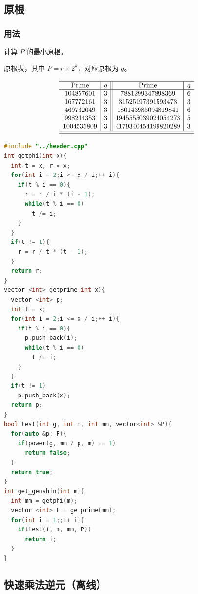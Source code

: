 \documentclass[10pt]{ctexart}
\begin{document}
\begin{multicols}{3}
    \subsection{原根}\label{ux539fux6839}

    \subsubsection{用法}\label{ux7528ux6cd5-9}

    计算 \(P\) 的最小原根。

    原根表，其中 \(P = r\times 2^{k}\)，对应原根为 \(g\)。

    \[
    \begin{array}{c|c||c|c}
    \hline\hline
    \mathrm{Prime} & g & \mathrm{Prime} & g \\ \hline
    104857601  & 3 & 7881299347898369 & 6 \\ 
    167772161  & 3 & 31525197391593473 & 3 \\ 
    469762049  & 3 & 180143985094819841 & 6 \\ 
    998244353  & 3 & 1945555039024054273 & 5 \\ 
    1004535809 & 3 & 4179340454199820289 & 3 \\ \hline\hline
    \hline 
    \end{array}
    \]

\begin{lstlisting}[language={C++}]
#include "../header.cpp"
int getphi(int x){
  int t = x, r = x;
  for(int i = 2;i <= x / i;++ i){
    if(t % i == 0){
      r = r / i * (i - 1);
      while(t % i == 0)
        t /= i;
    }
  }
  if(t != 1){
    r = r / t * (t - 1);
  }
  return r;
}
vector <int> getprime(int x){
  vector <int> p;
  int t = x;
  for(int i = 2;i <= x / i;++ i){
    if(t % i == 0){
      p.push_back(i);
      while(t % i == 0)
        t /= i;
    }
  }
  if(t != 1)
    p.push_back(x);
  return p;
}
bool test(int g, int m, int mm, vector<int> &P){
  for(auto &p: P){
    if(power(g, mm / p, m) == 1)
      return false;
  }
  return true;
}
int get_genshin(int m){
  int mm = getphi(m);
  vector <int> P = getprime(mm);
  for(int i = 1;;++ i){
    if(test(i, m, mm, P))
      return i;
  }
}
\end{lstlisting}

    \subsection{快速乘法逆元（离线）}\label{ux5febux901fux4e58ux6cd5ux9006ux5143ux79bbux7ebf}


\end{multicols}
\end{document}

